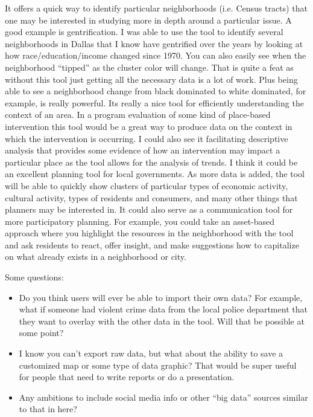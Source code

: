 \documentclass[a4paper]{article}
\begin{document}
It offers a quick way to identify particular neighborhoods (i.e. Census tracts)
that one may be interested in studying more in depth around a particular issue.
A good example is gentrification. I was able to use the tool to identify several
neighborhoods in Dallas that I know have gentrified over the years by looking at
how race/education/income changed since 1970. You can also easily see when the
neighborhood “tipped” as the cluster color will change. That is quite a feat as
without this tool just getting all the necessary data is a lot of work. Plus
being able to see a neighborhood change from black dominated to white dominated,
for example, is really powerful. Its really a nice tool for efficiently
understanding the context of an area. In a program evaluation of some kind of
place-based intervention this tool would be a great way to produce data on the
context in which the intervention is occurring. I could also see it facilitating
descriptive analysis that provides some evidence of how an intervention may
impact a particular place as the tool allows for the analysis of trends. I think
it could be an excellent planning tool for local governments. As more data is
added, the tool will be able to quickly show clusters of particular types of
economic activity, cultural activity, types of residents and consumers, and many
other things that planners may be interested in. It could also serve as a
communication tool for more participatory planning. For example, you could take
an asset-based approach where you highlight the resources in the neighborhood
with the tool and ask residents to react, offer insight, and make suggestions
how to capitalize on what already exists in a neighborhood or city.
 

Some questions:
\begin{itemize}
\item{Do you think users will ever be able to import their own data? For
example, what if someone had violent crime data from the local police department
that they want to overlay with the other data in the tool. Will that be possible
at some point?}

\item{I know you can’t export raw data, but what about the ability to save a
customized map or some type of data graphic? That would be super useful for
people that need to write reports or do a presentation.}

\item{Any ambitions to include social media info or other “big data” sources
similar to that in here?}
\end{itemize} 
\end{document}
